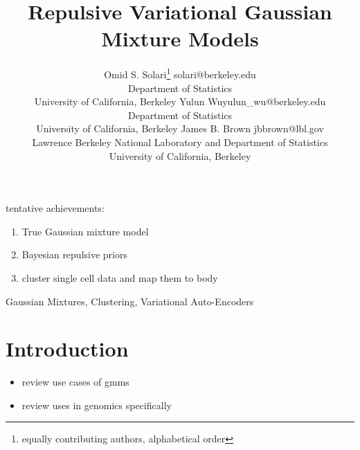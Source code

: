 \documentclass[twoside,11pt]{article}
\begin{document}
\title{Repulsive Variational Gaussian Mixture Models}

\author{\name Omid S. Solari\thanks{equally contributing authors, alphabetical order} \email solari@berkeley.edu \\
       \addr Department of Statistics\\
       University of California, Berkeley
       \AND
       \name Yulun Wu\footnotemark[1] \email yulun\_wu@berkeley.edu\\
       \addr Department of Statistics\\
       University of California, Berkeley
       \AND
       \name James B. Brown \email jbbrown@lbl.gov\\
       \addr Lawrence Berkeley National Laboratory and Department of Statistics\\
       University of California, Berkeley}

\editor{}

\maketitle

\begin{abstract}%


\end{abstract}

tentative achievements:
\begin{enumerate}
    \item True Gaussian mixture model
    \item Bayesian repulsive priors
    \item cluster single cell data and map them to body
\end{enumerate}


\begin{keywords}
Gaussian Mixtures, Clustering, Variational Auto-Encoders
\end{keywords}

\section{Introduction}

\begin{itemize}
    \item review use cases of gmms
    \item review uses in genomics specifically
\end{itemize}
\end{document}
